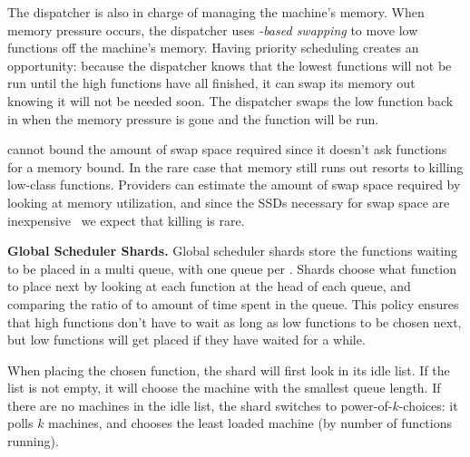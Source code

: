 The dispatcher is also in charge of managing the machine's memory. When memory
pressure occurs, the dispatcher uses \textit{\class{}-based swapping} to move
low \class{} functions off the machine's memory. Having priority scheduling
creates an opportunity: because the dispatcher knows that the lowest \class{}
functions will not be run until the high \class{} functions have all finished,
it can swap its memory out knowing it will not be needed soon. The dispatcher
swaps the low \class{} function back in when the memory pressure is gone and the
function will be run.

\Sys{} cannot bound the amount of swap space required since it doesn't ask
functions for a memory bound.  In the rare case that memory still runs out
\sys{} resorts to killing low-class functions.  Providers can estimate the
amount of swap space required by looking at memory utilization, and since the
SSDs necessary for swap space are inexpensive~\cite{ssd-price} we expect that
killing is rare.

\textbf{Global Scheduler Shards.}
Global scheduler shards store the functions waiting to be placed in a multi
queue, with one queue per \priceclass{}. Shards choose what function to place
next by looking at each function at the head of each queue, and comparing the
ratio of \class{} to amount of time spent in the queue. This policy ensures
that high \class{} functions don't have to wait as long as low \class{}
functions to be chosen next, but low \class{} functions will get placed if they
have waited for a while.

When placing the chosen function, the shard will first look in its
idle list. If the list is not empty, it will choose the machine with
the smallest queue length.  If there are no machines in the idle list,
the shard switches to power-of-$k$-choices: it polls $k$ machines, and
chooses the least loaded machine (by number of functions running).
